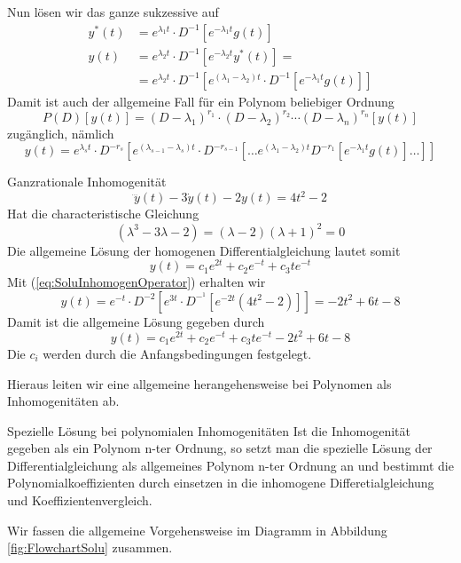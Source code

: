 Nun lösen wir das ganze sukzessive auf
\begin{align} 
  y^*(t)&=e^{\lambda_1t}\cdot D^{-1}\left[e^{-\lambda_1 t}g(t)\right]\nonumber\\
  y(t)  &=e^{\lambda_2t}\cdot D^{-1}\left[e^{-\lambda_2 t}y^*(t)\right]=\nonumber\\
        &=e^{\lambda_2t}\cdot D^{-1}\left[e^{(\lambda_1-\lambda_2) t}\cdot
      D^{-1}\left[e^{-\lambda_1 t}g(t)\right]\right]
  \label{eq:DGL2OrdnungSolu}
\end{align}
Damit ist auch der allgemeine Fall für ein Polynom beliebiger Ordnung 
\[ P(D)[y(t)]=(D-\lambda_1)^{r_1}\cdot(D-\lambda_2)^{r_2}\cdots 
(D-\lambda_n)^{r_n}[y(t)]\]
zugänglich, nämlich
\begin{equation}
  y(t)=e^{\lambda_s t}\cdot D^{-r_s}[e^{(\lambda_{s-1}-\lambda_s)t}\cdot D^{-r_{s-1}}
  [\dots e^{(\lambda_1-\lambda_2)t}D^{-r_1}[e^{-\lambda_1t}g(t)]\dots]]
  \label{eq:SoluInhomogenOperator}
\end{equation}
\begin{example}{Ganzrationale Inhomogenität}
  \[\dddot{y}(t)-3\dot{y}(t)-2y(t)=4t^2-2\]
  Hat die characteristische Gleichung
  \[(\lambda^3-3\lambda-2)=(\lambda-2)(\lambda+1)^2=0\]
  Die allgemeine Lösung der homogenen Differentialgleichung lautet somit
  \[y(t)=c_1e^{2t}+c_2e^{-t}+c_3te^{-t}\]
  Mit (\ref{eq:SoluInhomogenOperator}) erhalten wir
  \[
    y(t)=e^{-t}\cdot D^{-2}[e^{3t}\cdot D^{-^1}[e^{-2t}(4t^2-2)]]=-2t^2+6t-8
  \]
  Damit ist die allgemeine Lösung gegeben durch
  \[ y(t)=c_1e^{2t}+c_2e^{-t}+c_3te^{-t}-2t^2+6t-8 \]
  Die $c_i$ werden durch die Anfangsbedingungen festgelegt.
\end{example}
Hieraus leiten wir eine allgemeine herangehensweise bei Polynomen als
Inhomogenitäten ab.
\begin{note}{Spezielle Lösung bei polynomialen Inhomogenitäten}
  Ist die Inhomogenität gegeben als ein Polynom n-ter Ordnung, so setzt man die
  spezielle Lösung der Differentialgleichung als allgemeines Polynom n-ter
  Ordnung an und bestimmt die Polynomialkoeffizienten durch einsetzen in die
  inhomogene Differetialgleichung und Koeffizientenvergleich.
\end{note}
Wir fassen die allgemeine Vorgehensweise im Diagramm in Abbildung
\ref{fig:FlowchartSolu} zusammen.
%
